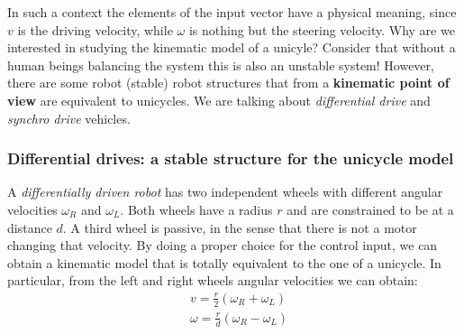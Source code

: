 In such a context the elements of the input vector have a physical meaning, since $v$ is the driving velocity, while $\omega$ is nothing but the steering velocity.  Why are we interested in studying the kinematic model of a unicyle? Consider that without a human beings balancing the system this is also an unstable system! However, there are some robot (stable) robot structures that from a \textbf{kinematic point of view} are equivalent to unicycles. We are talking about \emph{differential drive} and \emph{synchro drive} vehicles.

\subsubsection{Differential drives: a stable structure for the unicycle model}
A \textit{differentially driven robot} has two independent wheels with different angular velocities $\omega_R$ and $\omega_L$. Both wheels have a radius $r$ and are constrained to be at a distance $d$. A third wheel is passive, in the sense that there is not a motor changing that velocity. By doing a proper choice for the control input, we can obtain a kinematic model that is totally equivalent to the one of a unicycle. In particular, from the left and right wheels angular velocities we can obtain: 
\begin{align}
    &v=\frac{r}{2}{(\omega_R+\omega_L)}\\
    &\omega=\frac{r}{d}{(\omega_R-\omega_L)}
\end{align}

